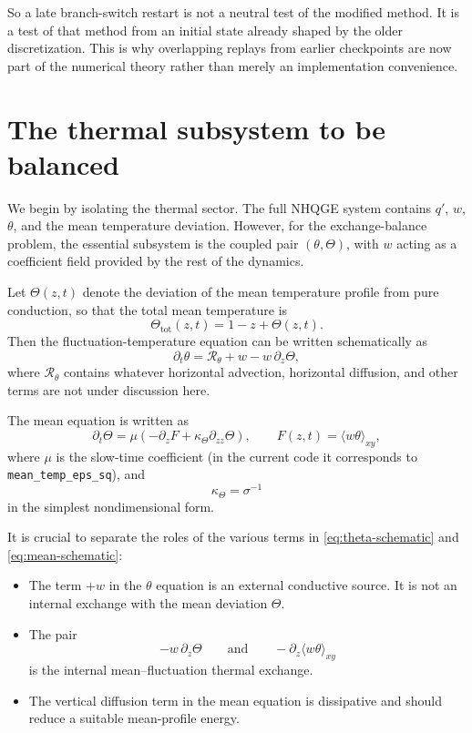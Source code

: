 \documentclass[11pt]{article}
\begin{document}
So a late branch-switch restart is not a neutral test of the modified method.
It is a test of that method from an initial state already shaped by the older
discretization. This is why overlapping replays from earlier checkpoints are
now part of the numerical theory rather than merely an implementation
convenience.

\section{The thermal subsystem to be balanced}

We begin by isolating the thermal sector. The full NHQGE system contains $q'$, $w$, $\theta$, and the mean temperature deviation. However, for the exchange-balance problem, the essential subsystem is the coupled pair $(\theta,\Theta)$, with $w$ acting as a coefficient field provided by the rest of the dynamics.

Let $\Theta(z,t)$ denote the deviation of the mean temperature profile from pure conduction, so that the total mean temperature is
\[
\Theta_{\mathrm{tot}}(z,t) = 1 - z + \Theta(z,t).
\]
Then the fluctuation-temperature equation can be written schematically as
\begin{equation}
\partial_t \theta
=
\mathcal R_\theta
+
w
-
w\,\partial_z\Theta,
\label{eq:theta-schematic}
\end{equation}
where $\mathcal R_\theta$ contains whatever horizontal advection, horizontal diffusion, and other terms are not under discussion here.

The mean equation is written as
\begin{equation}
\partial_t \Theta
=
\mu
\left(
-\partial_z F
+
\kappa_\Theta \partial_{zz}\Theta
\right),
\qquad
F(z,t) = \langle w\theta\rangle_{xy},
\label{eq:mean-schematic}
\end{equation}
where $\mu$ is the slow-time coefficient (in the current code it corresponds to \texttt{mean\_temp\_eps\_sq}), and
\[
\kappa_\Theta = \sigma^{-1}
\]
in the simplest nondimensional form.

It is crucial to separate the roles of the various terms in \eqref{eq:theta-schematic} and \eqref{eq:mean-schematic}:

\begin{itemize}
\item The term $+w$ in the $\theta$ equation is an external conductive source. It is not an internal exchange with the mean deviation $\Theta$.
\item The pair
\[
-w\,\partial_z\Theta
\qquad\text{and}\qquad
-\partial_z\langle w\theta\rangle_{xy}
\]
is the internal mean--fluctuation thermal exchange.
\item The vertical diffusion term in the mean equation is dissipative and should reduce a suitable mean-profile energy.
\end{itemize}
\end{document}
